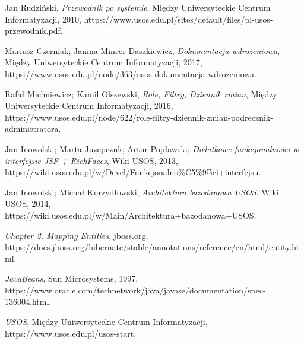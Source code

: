 \documentclass[licencjacka]{pracamgr}
\begin{document}
\begin{thebibliography}{99}

 Jan Rudziński, \textit{Przewodnik po systemie}, Między Uniwersyteckie Centrum Informatyzacji, 2010, https://www.usos.edu.pl/sites/default/files/pl-usos-przewodnik.pdf.

 Mariusz Czerniak; Janina Mincer-Daszkiewicz, \textit{Dokumentacja wdrożeniowa}, Między Uniwersyteckie Centrum Informatyzacji, 2017, https://www.usos.edu.pl/node/363/usos-dokumentacja-wdrozeniowa.

 Rafał Michniewicz; Kamil Olszewski, \textit{Role, Filtry, Dziennik zmian}, Między Uniwersyteckie Centrum Informatyzacji, 2016, https://www.usos.edu.pl/node/622/role-filtry-dziennik-zmian-podrecznik-administratora.

 Jan Inowolski; Marta Juzepczuk; Artur Popławski, \textit{Dodatkowe funkcjonalności w interfejsie JSF + RichFaces}, Wiki USOS, 2013, https://wiki.usos.edu.pl/w/Devel/Funkcjonalno\%C5\%9Bci+interfejsu.
 	
 Jan Inowolski; Michał Kurzydłowski, \textit{Architektura bazodanowa USOS}, Wiki USOS, 2014, https://wiki.usos.edu.pl/w/Main/Architektura+bazodanowa+USOS.

 \textit{Chapter 2. Mapping Entities}, jboss.org, https://docs.jboss.org/hibernate/stable/annotations/reference/en/html/entity.html.

 \textit{JavaBeans}, Sun Microsystems, 1997, https://www.oracle.com/technetwork/java/javase/documentation/spec-136004.html.

 \textit{USOS}, Między Uniwersyteckie Centrum Informatyzacji, https://www.usos.edu.pl/usos-start.

\end{thebibliography}
\end{document}
